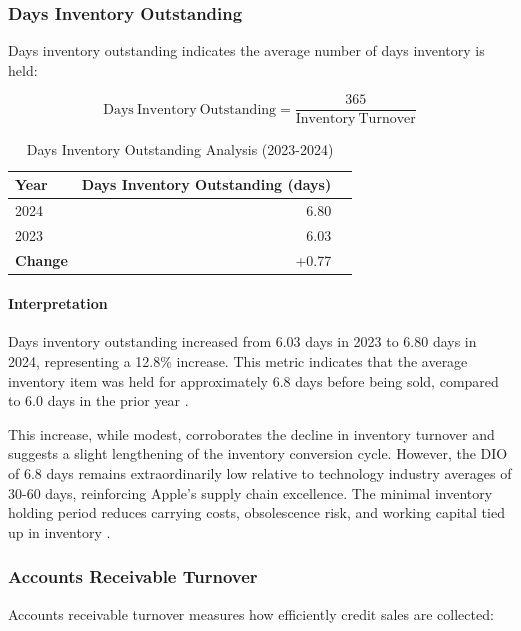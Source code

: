\documentclass[12pt,a4paper]{article}
\begin{document}
\subsubsection{Days Inventory Outstanding}

Days inventory outstanding indicates the average number of days inventory is held:

\begin{equation}
\mathrm{Days\ Inventory\ Outstanding} = \frac{365}{\mathrm{Inventory\ Turnover}}
\end{equation}

\begin{table}[H]
\centering
\caption{Days Inventory Outstanding Analysis (2023-2024)}
\label{tab:dio}
\begin{tabular}{lrr}
\toprule
\textbf{Year} & \textbf{Days Inventory Outstanding (days)} \\
\midrule
2024 & 6.80 \\
2023 & 6.03 \\
\textbf{Change} & +0.77 \\
\bottomrule
\end{tabular}
\end{table}

\paragraph{Interpretation}

Days inventory outstanding increased from 6.03 days in 2023 to 6.80 days in 2024, representing a 12.8\% increase. This metric indicates that the average inventory item was held for approximately 6.8 days before being sold, compared to 6.0 days in the prior year \citep{apple202410k}.

This increase, while modest, corroborates the decline in inventory turnover and suggests a slight lengthening of the inventory conversion cycle. However, the DIO of 6.8 days remains extraordinarily low relative to technology industry averages of 30-60 days, reinforcing Apple's supply chain excellence. The minimal inventory holding period reduces carrying costs, obsolescence risk, and working capital tied up in inventory \citep{kieso2023}.

\subsubsection{Accounts Receivable Turnover}

Accounts receivable turnover measures how efficiently credit sales are collected:
\end{document}
